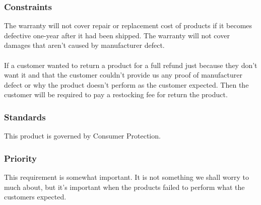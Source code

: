 \subsubsection{Constraints}
The warranty will not cover repair or replacement cost of products if it becomes defective one-year after it had been shipped. The warranty will not cover damages that aren't caused by manufacturer defect.
\\
\\
If a customer wanted to return a product for a full refund just because they don't want it and that the customer couldn't provide us any proof of manufacturer defect or why the product doesn't perform as the customer expected. Then the customer will be required to pay a restocking fee for return the product.
\subsubsection{Standards}
This product is governed by Consumer Protection.
\subsubsection{Priority}
This requirement is somewhat important. It is not something we shall worry to much about, but it's important when the products failed to perform what the customers expected.